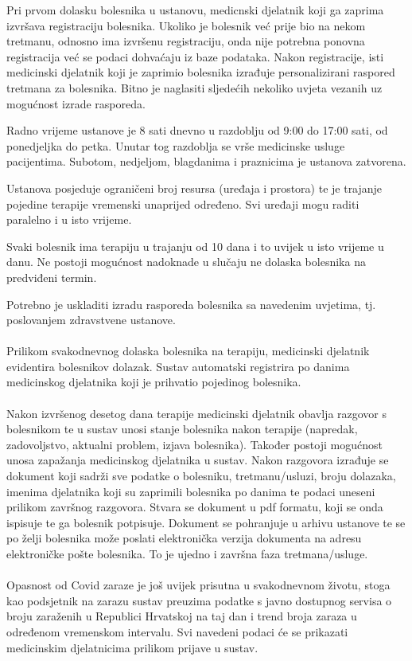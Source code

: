 		Pri prvom dolasku bolesnika u ustanovu, medicnski djelatnik koji ga zaprima izvršava registraciju bolesnika. Ukoliko je bolesnik već prije bio na nekom tretmanu, odnosno ima izvršenu registraciju, onda nije potrebna ponovna registracija već se podaci dohvaćaju iz baze podataka. Nakon registracije, isti medicinski djelatnik koji je zaprimio bolesnika izrađuje personalizirani raspored tretmana za bolesnika. Bitno je naglasiti sljedećih nekoliko uvjeta vezanih uz mogućnost izrade rasporeda.
		\begin{packed_enum}
			\item Radno vrijeme ustanove je 8 sati dnevno u razdoblju od 9:00 do 17:00 sati, od ponedjeljka do petka. Unutar tog razdoblja se vrše medicinske usluge pacijentima. Subotom, nedjeljom, blagdanima i praznicima je ustanova zatvorena.
			\item Ustanova posjeduje ograničeni broj resursa (uređaja i prostora) te je trajanje pojedine terapije vremenski unaprijed određeno. Svi uređaji mogu raditi paralelno i u isto vrijeme.
			\item Svaki bolesnik ima terapiju u trajanju od 10 dana i to uvijek u isto vrijeme u danu. Ne postoji mogućnost nadoknade u slučaju ne dolaska bolesnika na predviđeni termin.  
		\end{packed_enum}
		Potrebno je uskladiti izradu rasporeda bolesnika sa navedenim uvjetima, tj. poslovanjem zdravstvene ustanove.
		\\\\
		Prilikom svakodnevnog dolaska bolesnika na terapiju, medicinski djelatnik evidentira bolesnikov dolazak. Sustav automatski registrira po danima medicinskog djelatnika koji je prihvatio pojedinog bolesnika. 
		\\\\
		Nakon izvršenog desetog dana terapije medicinski djelatnik obavlja razgovor s bolesnikom te u sustav unosi stanje bolesnika nakon terapije (napredak, zadovoljstvo, aktualni problem, izjava bolesnika). Također postoji mogućnost unosa zapažanja medicinskog djelatnika u sustav. Nakon razgovora izrađuje se dokument koji sadrži sve podatke o bolesniku, tretmanu/usluzi, broju dolazaka, imenima djelatnika koji su zaprimili bolesnika po danima te podaci uneseni prilikom završnog razgovora. Stvara se dokument u pdf formatu, koji se onda ispisuje te ga bolesnik potpisuje. Dokument se pohranjuje u arhivu ustanove te se po želji bolesnika može poslati elektronička verzija dokumenta na adresu elektroničke pošte bolesnika. To je ujedno i završna faza tretmana/usluge. 
		\\\\
		Opasnost od Covid zaraze je još uvijek prisutna u svakodnevnom životu, stoga kao podsjetnik na zarazu sustav preuzima podatke s javno dostupnog servisa o broju zaraženih u Republici Hrvatskoj na taj dan i trend broja zaraza u određenom vremenskom intervalu. Svi navedeni podaci će se prikazati medicinskim djelatnicima prilikom prijave u sustav. 
		\eject	
	